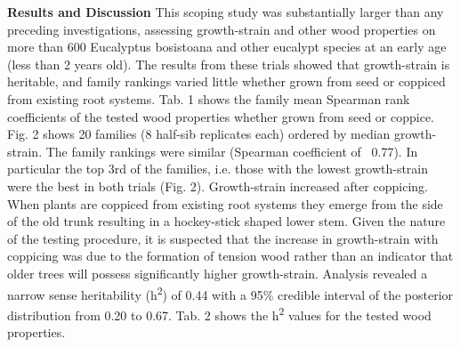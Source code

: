\textbf{Results and Discussion}
This scoping study was substantially larger than any preceding investigations, assessing growth-strain and other wood properties on more than 600 Eucalyptus bosistoana and other eucalypt species at an early age (less than 2 years old). The results from these trials showed that growth-strain is heritable, and family rankings varied little whether grown from seed or coppiced from existing root systems. Tab. 1 shows the family mean Spearman rank coefficients of the tested wood properties whether grown from seed or coppice. Fig. 2 shows 20 families (8 half-sib replicates each) ordered by median growth-strain. The family rankings were similar (Spearman coefficient of ~0.77). In particular the top 3rd of the families, i.e. those with the lowest growth-strain were the best in both trials (Fig. 2). Growth-strain increased after coppicing. When plants are coppiced from existing root systems they emerge from the side of the old trunk resulting in a hockey-stick shaped lower stem. Given the nature of the testing procedure, it is suspected that the increase in growth-strain with coppicing was due to the formation of tension wood rather than an indicator that older trees will possess significantly higher growth-strain. Analysis revealed a narrow sense heritability (h\textsuperscript{2}) of 0.44 with a 95\% credible interval of the posterior distribution from 0.20 to 0.67. Tab. 2 shows the h\textsuperscript{2} values for the tested wood properties.
